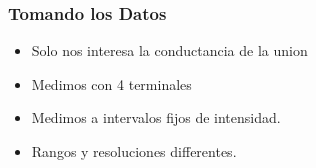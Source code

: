   
  
\frame
{
  \frametitle{Tomando los Datos}
  
  \begin{itemize}
    \item<1-> Solo nos interesa la conductancia de la union
    \item<2-> Medimos con 4 terminales
    \item<3-> Medimos a intervalos fijos de intensidad.
    \item<4-> Rangos y resoluciones differentes.
  \end{itemize}

}